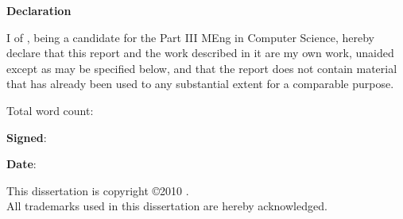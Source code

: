 \newpage
{\Huge \bf Declaration}

\vspace{24pt} 

I \authorname of \authorcollege, being a candidate for the Part III MEng
in Computer Science, hereby declare that this report and the
work described in it are my own work, unaided except as may be
specified below, and that the report does not contain material that
has already been used to any substantial extent for a comparable
purpose.

\vspace{24pt}
Total word count: \wordcount

\vspace{60pt}
\textbf{Signed}: 

\vspace{12pt}
\textbf{Date}:


\vfill

This dissertation is copyright \copyright 2010 \authorname. 
\\
All trademarks used in this dissertation are hereby acknowledged.



\newpage
\vspace*{\fill}

